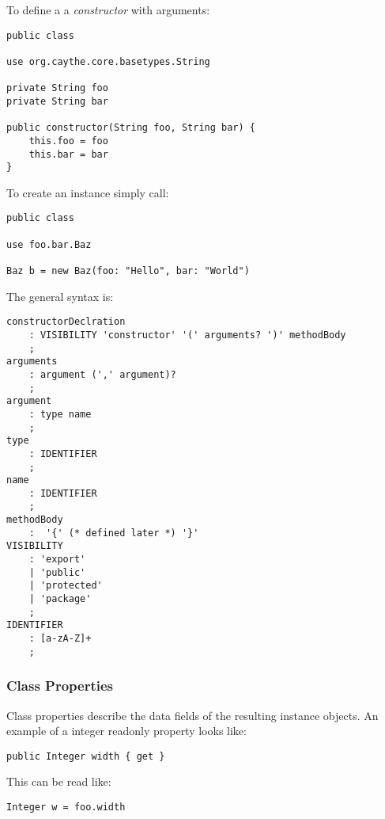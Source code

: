 \documentclass[11pt,a4paper]{report}
\begin{document}
To define a a \textit{constructor} with arguments:

\begin{lstlisting}[language=CayThe, title=Type foo.bar.Baz with argument constructor]
public class

use org.caythe.core.basetypes.String

private String foo
private String bar

public constructor(String foo, String bar) {
    this.foo = foo
    this.bar = bar
}
\end{lstlisting}

To create an instance simply call:

\begin{lstlisting}[language=CayThe, title=Make an instance of foo.bar.Baz]
public class

use foo.bar.Baz

Baz b = new Baz(foo: "Hello", bar: "World")
\end{lstlisting}

The general syntax is:

\begin{lstlisting}[title=Grammar for constructor declaration]
constructorDeclration 
    : VISIBILITY 'constructor' '(' arguments? ')' methodBody
    ;
arguments
    : argument (',' argument)?
    ;
argument
    : type name
    ;
type 
    : IDENTIFIER
    ;
name
    : IDENTIFIER
    ;
methodBody
    :  '{' (* defined later *) '}'
VISIBILITY
    : 'export'
    | 'public'
    | 'protected'
    | 'package'
    ;
IDENTIFIER
    : [a-zA-Z]+
    ;
\end{lstlisting}

\subsubsection{Class Properties}

Class properties describe the data fields of the resulting instance objects. An example of a integer readonly property looks like:

\begin{lstlisting}[language=CayThe, title=Example for readonly property]
public Integer width { get }
\end{lstlisting}

This can be read like:

\begin{lstlisting}[language=CayThe, title=Example for property read access]
Integer w = foo.width
\end{lstlisting}
\end{document}

